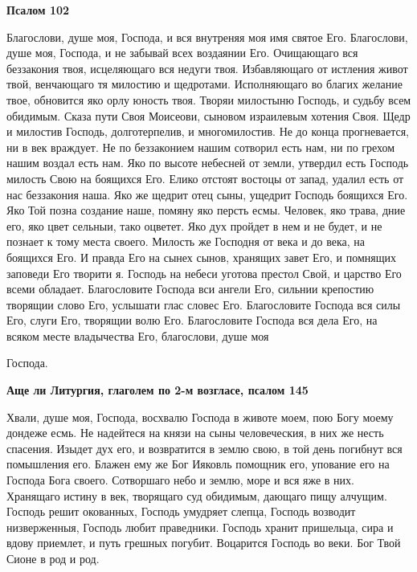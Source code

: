  

\bfseries Псалом 102\normalfont{}


   Благослови, душе моя, Господа, и вся внутреняя моя имя святое Его.
Благослови, душе моя, Господа, и не забывай всех воздаянии Его.
Очищающаго вся беззакония твоя, исцеляющаго вся недуги твоя.
Избавляющаго от истления живот твой, венчающаго тя милостию и
щедротами. Исполняющаго во благих желание твое, обновится яко орлу
юность твоя. Творяи милостыню Господь, и судьбу всем обидимым. Сказа
пути Своя Моисеови, сыновом израилевым хотения Своя. Щедр и милостив
Господь, долготерпелив, и многомилостив. Не до конца прогневается, ни в
век враждует. Не по беззаконием нашим сотворил есть нам, ни по грехом
нашим воздал есть нам. Яко по высоте небесней от земли, утвердил есть
Господь милость Свою на боящихся Его. Елико отстоят востоцы от запад,
удалил есть от нас беззакония наша. Яко же щедрит отец сыны, ущедрит
Господь боящихся Его. Яко Той позна создание наше, помяну яко персть
есмы. Человек, яко трава, дние его, яко цвет сельныи, тако оцветет.
Яко дух пройдет в нем и не будет, и не познает к тому места своего.
Милость же Господня от века и до века, на боящихся Его. И правда
Его на сынех сынов, хранящих завет Его, и помнящих заповеди Его
творити я. Господь на небеси уготова престол Свой, и царство Его всеми
обладает. Благословите Господа вси ангели Его, сильнии крепостию
творящии слово Его, услышати глас словес Его. Благословите Господа вся
силы Его, слуги Его, творящии волю Его. Благословите Господа вся
дела Его, на всяком месте владычества Его, благослови, душе моя

Господа.






 

\bfseries Аще ли Литургия, глаголем по 2-м возгласе, псалом 145\normalfont{}


   Хвали, душе моя, Господа, восхвалю Господа в животе моем, пою Богу
моему дондеже есмь. Не надейтеся на князи на сыны человеческия, в них же
несть спасения. Изыдет дух его, и возвратится в землю свою, в той
день погибнут вся помышления его. Блажен ему же Бог Ияковль
помощник его, упование его на Господа Бога своего. Сотворшаго небо и
землю, море и вся яже в них. Хранящаго истину в век, творящаго суд
обидимым, дающаго пищу алчущим. Господь решит окованных, Господь
умудряет слепца, Господь возводит низверженныя, Господь любит
праведники. Господь хранит пришельца, сира и вдову приемлет, и путь
грешных погубит. Воцарится Господь во веки. Бог Твой Сионе в род и
род.


